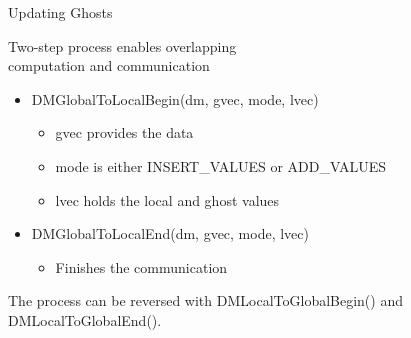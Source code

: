 \begin{frame}{Updating Ghosts}

Two-step process enables overlapping\\
computation and communication

\medskip

\begin{itemize}
  \item {\kb DMGlobalToLocalBegin(dm, gvec, mode, lvec)}
  \begin{itemize}
    \item {\kb gvec} provides the data 
    \item {\kb mode} is either {\kb INSERT\_VALUES} or {\kb ADD\_VALUES}
    \item {\kb lvec} holds the local and ghost values
  \end{itemize}

  \item {\kb DMGlobalToLocalEnd(dm, gvec, mode, lvec)}
  \begin{itemize}
    \item Finishes the communication
  \end{itemize}
\end{itemize}

\medskip

The process can be reversed with {\kb DMLocalToGlobalBegin()} and {\kb DMLocalToGlobalEnd()}.
\end{frame}
